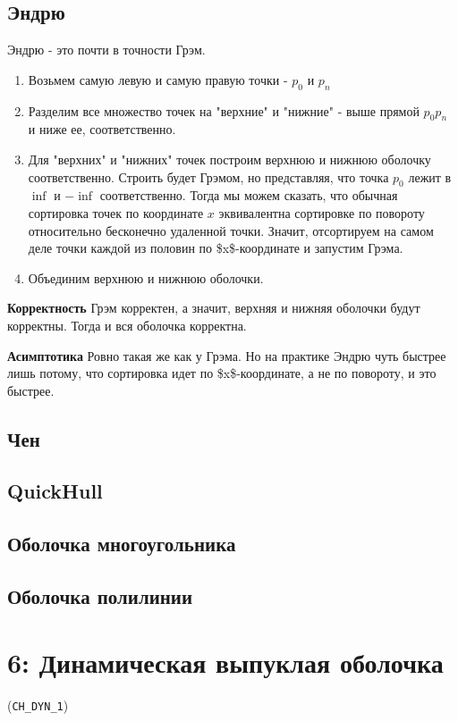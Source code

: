 \documentclass[11pt]{article}
\begin{document}
\subsection{{\bfseries{}} Эндрю}
\label{sec:orgheadline24}
Эндрю - это почти в точности Грэм.
\begin{enumerate}
\item Возьмем самую левую и самую правую точки - \(p_0\) и \(p_n\)
\item Разделим все множество точек на "верхние" и "нижние" - выше прямой \(p_0 p_n\) и ниже ее, соответственно.
\item Для "верхних" и "нижних" точек построим верхнюю и нижнюю оболочку соответственно.
Строить будет Грэмом, но представляя, что точка \(p_0\) лежит в \(\inf\) и \(-\inf\) соответственно.
Тогда мы можем сказать, что обычная сортировка точек по координате \(x\) эквивалентна сортировке по
повороту относительно бесконечно удаленной точки. Значит, отсортируем на самом деле точки каждой
из половин по \$x\$-координате и запустим Грэма.
\item Объединим верхнюю и нижнюю оболочки.
\end{enumerate}

\textbf{Корректность}
Грэм корректен, а значит, верхняя и нижняя оболочки будут корректны. Тогда и вся оболочка корректна.

\textbf{Асимптотика}
Ровно такая же как у Грэма. Но на практике Эндрю чуть быстрее лишь потому, что сортировка идет
по \$x\$-координате, а не по повороту, и это быстрее.
\subsection{{\bfseries{}} Чен}
\label{sec:orgheadline25}
\subsection{{\bfseries{}} QuickHull}
\label{sec:orgheadline26}
\subsection{{\bfseries{}} Оболочка многоугольника}
\label{sec:orgheadline27}
\subsection{{\bfseries{}} Оболочка полилинии}
\label{sec:orgheadline28}
\section{{\bfseries{}} 6:  Динамическая выпуклая оболочка}
\label{sec:orgheadline30}
(\texttt{CH\_DYN\_1})
\end{document}
